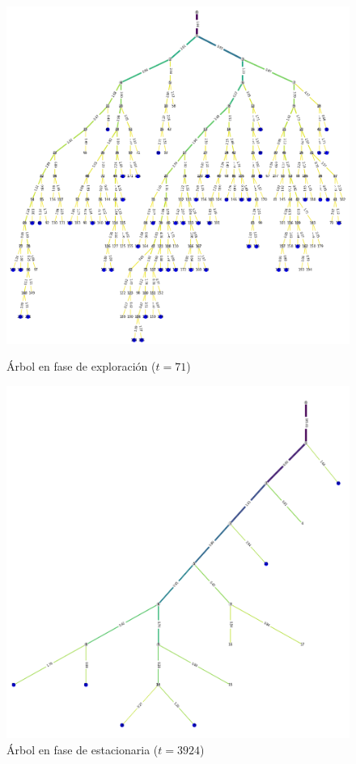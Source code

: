 \documentclass{article}
\begin{document}
\begin{figure}[h!]
\begin{minipage}{0.5\textwidth}
    \centering
    \includegraphics[width=\textwidth]{graficos_inst/arbol_exp.png}
    \caption[]{Árbol en fase de exploración ($t=71$)}
    \label{fig:arbol_exp}
\end{minipage} 
\begin{minipage}{0.5\textwidth}
    \centering
    \includegraphics[width=\textwidth]{graficos_inst/arbol_est.png}
    \caption[]{Árbol en fase de estacionaria ($t=3924$)}
    \label{fig:arbol_est}
\end{minipage}   
\end{figure}
\end{document}
